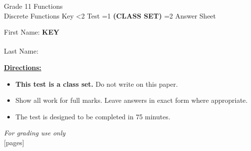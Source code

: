 \documentclass[addpoints]{exam}
\newcommand{\event}{Discrete Functions}
\newcommand{\tournament}{}
\def\type{0}
\begin{document}
\begin{center}
    {\huge Grade 11 Functions \\ \event
    \ifprintanswers \space Key
    \else \space \ifnum\type<2 Test \fi \ifnum\type=1 \textbf{(CLASS SET)} \fi
          \ifnum\type=2 Answer Sheet \fi
    \fi \\ \vspace{3mm}\tournament\vspace{1mm}}
\end{center}

\vspace{.25\textheight}

\begin{center}
    First Name: \ifprintanswers
    \underline{\hspace{3.5cm}}\textbf{KEY}\underline{\hspace{5.5cm}}\\\vspace{5mm}
    \else \underline{\hspace{10cm}}\\ \vspace{5mm} \fi
    Last Name: \underline{\hspace{10cm}}\\ \vspace{5mm}
\end{center}

\noindent\textbf{\underline{Directions:}}
\begin{itemize}
    \ifnum\type=1 \item \textbf{This test is a class set.} Do not write on this paper. \fi
    \item Show all work for full marks. Leave answers in exact form where appropriate.
    \item The test is designed to be completed in 75 minutes.
\end{itemize}
\begin{center}
\textit{For grading use only}\\
[pages]
\end{center}
\end{document}
